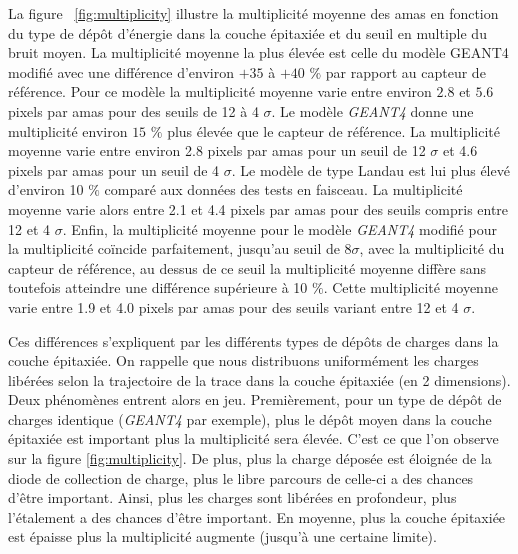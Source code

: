    La figure ~\ref{fig:multiplicity} illustre la multiplicit\'e moyenne des amas en fonction du type de d\'epôt d'\'energie dans la couche épitaxiée et du seuil en multiple du bruit moyen. La multiplicit\'e moyenne la plus \'elev\'ee est celle du mod\`ele GEANT4 modifi\'e avec une diff\'erence d'environ $+35$ \`a $+40$ $\%$ par rapport au capteur de r\'ef\'erence. Pour ce mod\`ele la multiplicit\'e moyenne varie entre environ $2.8$ et $5.6$ pixels par amas pour des seuils de 12 \`a 4 $\sigma$. Le mod\`ele \textit{GEANT4} donne une multiplicit\'e environ $15$ $\%$ plus \'elev\'ee que le capteur de r\'ef\'erence. La multiplicit\'e moyenne varie entre environ 2.8 pixels par amas pour un seuil de 12 $\sigma$ et 4.6 pixels par amas pour un seuil de 4 $\sigma$. Le mod\`ele de type Landau est lui plus \'elev\'e d'environ 10 $\%$ compar\'e aux donn\'ees des tests en faisceau. La multiplicit\'e moyenne varie alors entre 2.1 et 4.4 pixels par amas pour des seuils compris entre 12 et 4 $\sigma$. Enfin, la multiplicit\'e moyenne pour le mod\`ele \textit{GEANT4} modifi\'e pour la multiplicit\'e coïncide parfaitement, jusqu'au seuil de $8 \sigma$, avec la multiplicit\'e du capteur de r\'ef\'erence, au dessus de ce seuil la multiplicit\'e moyenne diffère sans toutefois atteindre une différence sup\'erieure \`a 10 $\%$. Cette multiplicit\'e moyenne varie entre 1.9 et 4.0 pixels par amas pour des seuils variant entre 12 et 4 $\sigma$. 
   
   \medskip
   
   Ces diff\'erences s'expliquent par les diff\'erents types de d\'epôts de charges dans la couche \'epitaxi\'ee. On rappelle que nous distribuons uniform\'ement les charges lib\'er\'ees selon la trajectoire de la trace dans la couche \'epitaxi\'ee (en 2 dimensions). Deux ph\'enom\`enes entrent alors en jeu. Premi\`erement, pour un type de d\'epôt de charges identique (\textit{GEANT4} par exemple), plus le d\'epôt moyen dans la couche \'epitaxi\'ee est important plus la multiplicit\'e sera \'elev\'ee. C'est ce que l'on observe sur la figure \ref{fig:multiplicity}. De plus, plus la charge d\'epos\'ee est \'eloign\'ee de la diode de collection de charge, plus le libre parcours de celle-ci a des chances d'\^etre important. Ainsi, plus les charges sont lib\'er\'ees en profondeur, plus l'\'etalement a des chances d'\^etre important. En moyenne, plus la couche \'epitaxi\'ee est \'epaisse plus la multiplicit\'e augmente (jusqu'\`a une certaine limite).
   
